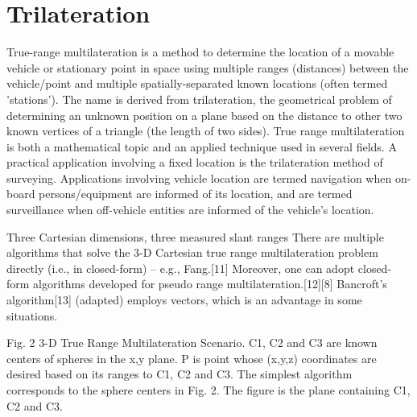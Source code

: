 \documentclass[\main/thesis.tex]{subfiles}
\begin{document}

\section{Trilateration}
True-range multilateration is a method to determine the location of a movable vehicle or stationary point in space using multiple ranges (distances) between the vehicle/point and multiple spatially-separated known locations (often termed 'stations'). The name is derived from trilateration, the geometrical problem of determining an unknown position on a plane based on the distance to other two known vertices of a triangle (the length of two sides). True range multilateration is both a mathematical topic and an applied technique used in several fields. A practical application involving a fixed location is the trilateration method of surveying. Applications involving vehicle location are termed navigation when on-board persons/equipment are informed of its location, and are termed surveillance when off-vehicle entities are informed of the vehicle's location.

Three Cartesian dimensions, three measured slant ranges
There are multiple algorithms that solve the 3-D Cartesian true range multilateration problem directly (i.e., in closed-form) – e.g., Fang.[11] Moreover, one can adopt closed-form algorithms developed for pseudo range multilateration.[12][8] Bancroft's algorithm[13] (adapted) employs vectors, which is an advantage in some situations.


Fig. 2 3-D True Range Multilateration Scenario. C1, C2 and C3 are known centers of spheres in the x,y plane. P is point whose (x,y,z) coordinates are desired based on its ranges to C1, C2 and C3.
The simplest algorithm corresponds to the sphere centers in Fig. 2. The figure  is the plane containing C1, C2 and C3. 
\end{document}
